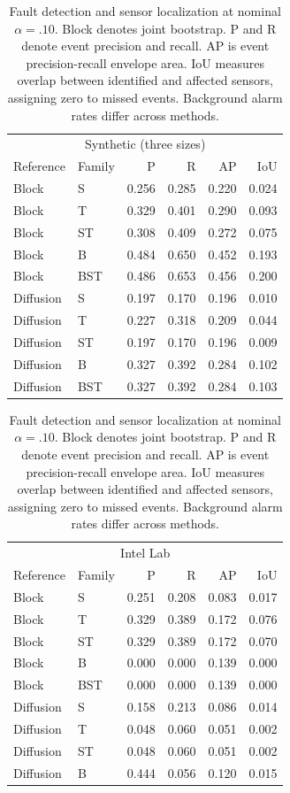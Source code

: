 \documentclass{llncs}
\begin{document}
\begin{table}[!tbp]\centering\small
\caption{Fault detection and sensor localization at nominal $\alpha=.10$.
Block denotes joint bootstrap. P and R denote event precision and recall.
AP is event precision-recall envelope area. IoU measures overlap between
identified and affected sensors, assigning zero to missed events.
Background alarm rates differ across methods.}\label{tab:main}
\begin{tabular}{llrrrr}\toprule
\multicolumn{6}{c}{Synthetic (three sizes)}\\
Reference&Family&P&R&AP&IoU\\\midrule
Block & S & 0.256 & 0.285 & 0.220 & 0.024 \\
Block & T & 0.329 & 0.401 & 0.290 & 0.093 \\
Block & ST & 0.308 & 0.409 & 0.272 & 0.075 \\
Block & B & 0.484 & 0.650 & 0.452 & 0.193 \\
Block & BST & 0.486 & 0.653 & 0.456 & 0.200 \\
\midrule
Diffusion & S & 0.197 & 0.170 & 0.196 & 0.010 \\
Diffusion & T & 0.227 & 0.318 & 0.209 & 0.044 \\
Diffusion & ST & 0.197 & 0.170 & 0.196 & 0.009 \\
Diffusion & B & 0.327 & 0.392 & 0.284 & 0.102 \\
Diffusion & BST & 0.327 & 0.392 & 0.284 & 0.103 \\
\bottomrule
\end{tabular}
\par\medskip
\begin{tabular}{llrrrr}\toprule
\multicolumn{6}{c}{Intel Lab}\\
Reference&Family&P&R&AP&IoU\\\midrule
Block & S & 0.251 & 0.208 & 0.083 & 0.017 \\
Block & T & 0.329 & 0.389 & 0.172 & 0.076 \\
Block & ST & 0.329 & 0.389 & 0.172 & 0.070 \\
Block & B & 0.000 & 0.000 & 0.139 & 0.000 \\
Block & BST & 0.000 & 0.000 & 0.139 & 0.000 \\
\midrule
Diffusion & S & 0.158 & 0.213 & 0.086 & 0.014 \\
Diffusion & T & 0.048 & 0.060 & 0.051 & 0.002 \\
Diffusion & ST & 0.048 & 0.060 & 0.051 & 0.002 \\
Diffusion & B & 0.444 & 0.056 & 0.120 & 0.015 \\

\end{tabular}
\end{table}
\end{document}
